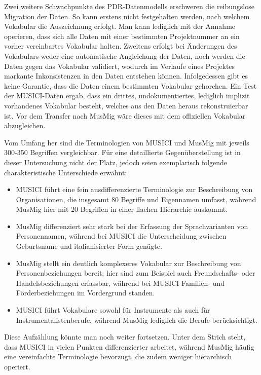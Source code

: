 \documentclass[a4paper,
fontsize=11pt,
oneside,
numbers=noperiodatend,
parskip=half-,
bibliography=totoc,
final
]{scrartcl}
\begin{document}
Zwei weitere Schwachpunkte des PDR-Datenmodells erschweren die
reibungslose Migration der Daten. So kann erstens nicht festgehalten
werden, nach welchem Vokabular die Auszeichnung erfolgt. Man kann
lediglich mit der Annahme operieren, dass sich alle Daten mit einer
bestimmten Projektnummer an ein vorher vereinbartes Vokabular halten.
Zweitens erfolgt bei Änderungen des Vokabulars weder eine automatische
Angleichung der Daten, noch werden die Daten gegen das Vokabular
validiert, wodurch im Verlaufe eines Projektes markante Inkonsistenzen
in den Daten entstehen können. Infolgedessen gibt es keine Garantie,
dass die Daten einem bestimmten Vokabular gehorchen. Ein Test der
MUSICI-Daten ergab, dass ein drittes, undokumentiertes, lediglich
implizit vorhandenes Vokabular besteht, welches aus den Daten heraus
rekonstruierbar ist. Vor dem Transfer nach MusMig wäre dieses mit dem
offiziellen Vokabular abzugleichen.

Vom Umfang her sind die Terminologien von MUSICI und MusMig mit jeweils
300-350 Begriffen vergleichbar. Für eine detaillierte Gegenüberstellung
ist in dieser Untersuchung nicht der Platz, jedoch seien exemplarisch
folgende charakteristische Unterschiede erwähnt:

\begin{itemize}
\item
  MUSICI führt eine fein ausdifferenzierte Terminologie zur Beschreibung
  von Organisationen, die insgesamt 80 Begriffe und Eigennamen umfasst,
  während MusMig hier mit 20 Begriffen in einer flachen Hierarchie
  auskommt.
\item
  MusMig differenziert sehr stark bei der Erfassung der Sprachvarianten
  von Personennamen, während bei MUSICI die Unterscheidung zwischen
  Geburtsname und italianisierter Form genügte.
\item
  MusMig stellt ein deutlich komplexeres Vokabular zur Beschreibung von
  Personenbeziehungen bereit; hier sind zum Beispiel auch Freundschafts-
  oder Handelsbeziehungen erfassbar, während bei MUSICI Familien- und
  Förderbeziehungen im Vordergrund standen.
\item
  MUSICI führt Vokabulare sowohl für Instrumente als auch für
  Instrumentalistenberufe, während MusMig lediglich die Berufe
  berücksichtigt.
\end{itemize}

Diese Aufzählung könnte man noch weiter fortsetzen. Unter dem Strich
steht, dass MUSICI in vielen Punkten differenzierter arbeitet, während
MusMig häufig eine vereinfachte Terminologie bevorzugt, die zudem
weniger hierarchisch operiert.
\end{document}
